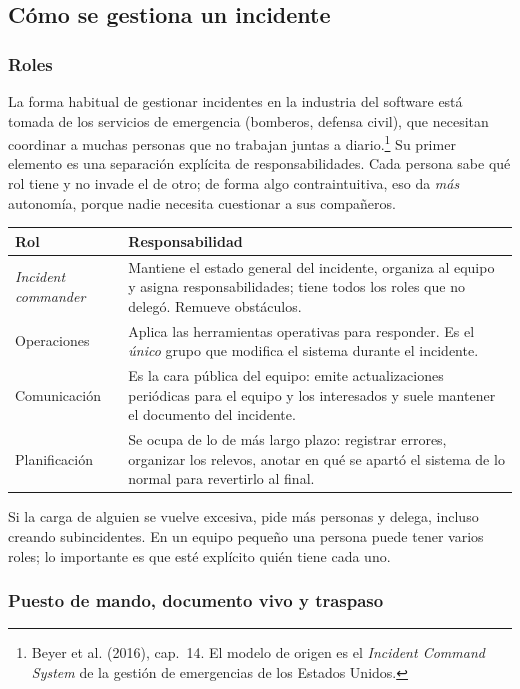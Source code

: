\documentclass[variant=apuntes,cover=institutional,mode=screen]{ua-engineering-v6-article}
\begin{document}
\subsection{Cómo se gestiona un incidente}

\subsubsection{Roles}

La forma habitual de gestionar incidentes en la industria del software está tomada de los servicios de emergencia (bomberos, defensa civil), que necesitan coordinar a muchas personas que no trabajan juntas a diario.\footnote{Beyer et al. (2016), cap.~14. El modelo de origen es el \emph{Incident Command System} de la gestión de emergencias de los Estados Unidos.} Su primer elemento es una separación explícita de responsabilidades. Cada persona sabe qué rol tiene y no invade el de otro; de forma algo contraintuitiva, eso da \emph{más} autonomía, porque nadie necesita cuestionar a sus compañeros.

\begin{center}
\begin{tabular}{p{}p{}}
\toprule
\textbf{Rol} & \textbf{Responsabilidad} \\
\midrule
\emph{Incident commander} & Mantiene el estado general del incidente, organiza al equipo y asigna responsabilidades; tiene todos los roles que no delegó. Remueve obstáculos. \\
Operaciones & Aplica las herramientas operativas para responder. Es el \emph{único} grupo que modifica el sistema durante el incidente. \\
Comunicación & Es la cara pública del equipo: emite actualizaciones periódicas para el equipo y los interesados y suele mantener el documento del incidente. \\
Planificación & Se ocupa de lo de más largo plazo: registrar errores, organizar los relevos, anotar en qué se apartó el sistema de lo normal para revertirlo al final. \\
\bottomrule
\end{tabular}
\end{center}

Si la carga de alguien se vuelve excesiva, pide más personas y delega, incluso creando subincidentes. En un equipo pequeño una persona puede tener varios roles; lo importante es que esté explícito quién tiene cada uno.

\subsubsection{Puesto de mando, documento vivo y traspaso}
\end{document}
